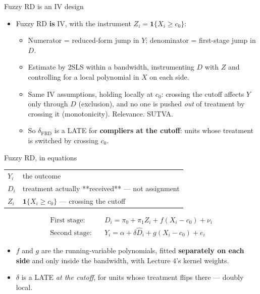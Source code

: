 \documentclass[
  11pt,
  ignorenonframetext,
  aspectratio=169,
]{beamer}
\providecommand{\tightlist}{%
  \setlength{\itemsep}{0pt}\setlength{\parskip}{0pt}}
\begin{document}
\begin{frame}{Fuzzy RD is an IV design}
\protect{}\label{fuzzy-rd-is-an-iv-design}
\begin{itemize}
\tightlist
\item
  Fuzzy RD \textbf{is} IV, with the instrument
  \(Z_i = \mathbf{1}\{X_i \geq c_0\}\):

  \begin{itemize}
  \tightlist
  \item
    Numerator = reduced-form jump in \(Y\); denominator = first-stage
    jump in \(D\).
  \item
    Estimate by 2SLS within a bandwidth, instrumenting \(D\) with \(Z\)
    and controlling for a local polynomial in \(X\) on each side.
  \item
    Same IV assumptions, holding locally at \(c_0\): crossing the cutoff
    affects \(Y\) only through \(D\) (exclusion), and no one is pushed
    \emph{out} of treatment by crossing it (monotonicity). Relevance.
    SUTVA.
  \item
    So \(\delta_{\text{FRD}}\) is a LATE for \textbf{compliers at the
    cutoff}: units whose treatment is switched by crossing \(c_0\).
  \end{itemize}
\end{itemize}
\end{frame}

\begin{frame}{Fuzzy RD, in equations}
\protect{}\label{fuzzy-rd-in-equations}
\begin{center}\small
\begin{tabular}{ll}
\toprule
$Y_i$ & the outcome \\
$D_i$ & treatment actually **received** --- not assignment \\
$Z_i$ & $\mathbf{1}\{X_i \geq c_0\}$ --- crossing the cutoff \\
\bottomrule
\end{tabular}
\end{center}

\vspace{-0.3em}

\begin{align*}
\text{First stage:}\quad & D_i = \pi_0 + \pi_1 Z_i + f(X_i - c_0) + \nu_i \\
\text{Second stage:}\quad & Y_i = \alpha + \delta \hat D_i + g(X_i - c_0) + e_i
\end{align*}

\vspace{-0.3em}

\begin{itemize}
\tightlist
\item
  \(f\) and \(g\) are the running-variable polynomials, fitted
  \textbf{separately on each side} and only inside the bandwidth, with
  Lecture 4's kernel weights.
\item
  \(\delta\) is a LATE \emph{at the cutoff}, for units whose treatment
  flips there --- doubly local.
\end{itemize}
\end{frame}
\end{document}
